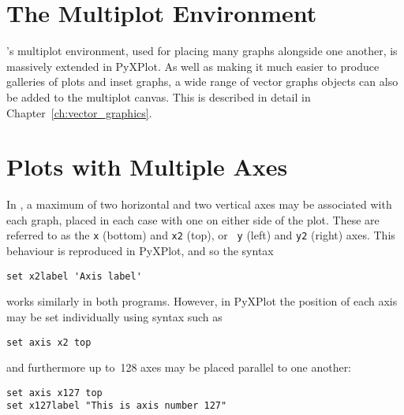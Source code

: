 \vspace{3mm}
\newline
{}
\vspace{3mm}\newline
{}\newline
{}\newline
{}
\vspace{3mm}

\section{The Multiplot Environment}

\gnuplot's multiplot environment, used for placing many graphs alongside one
another, is massively extended in PyXPlot.  As well as making it much easier to
produce galleries of plots and inset graphs, a wide range of vector graphs
objects can also be added to the multiplot canvas. This is described in detail
in Chapter~\ref{ch:vector_graphics}.

\section{Plots with Multiple Axes}

In \gnuplot, a maximum of two horizontal and two vertical axes may be
associated with each graph, placed in each case with one on either side of the
plot. These are referred to as the {\tt x} (bottom) and {\tt x2} (top), or {\tt
y} (left) and {\tt y2} (right) axes.  This behaviour is reproduced in PyXPlot,
and so the syntax

\begin{verbatim}
set x2label 'Axis label'
\end{verbatim}

\noindent works similarly in both programs. However, in PyXPlot the position of
each axis may be set individually using syntax such as

\begin{verbatim}
set axis x2 top
\end{verbatim}

\noindent and furthermore up to~128 axes may be placed parallel to one another:

\begin{verbatim}
set axis x127 top
set x127label "This is axis number 127"
\end{verbatim}

